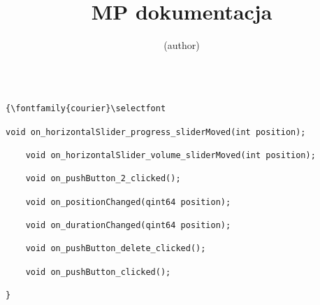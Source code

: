 \documentclass{article}
\begin{document}
\title{MP dokumentacja}
\author{(author)}
\maketitle

\begin{abstract}
\lipsum[1]
\end{abstract}


\begin{tcolorbox}
\begin{lstlisting}

{\fontfamily{courier}\selectfont

void on_horizontalSlider_progress_sliderMoved(int position);

    void on_horizontalSlider_volume_sliderMoved(int position);

    void on_pushButton_2_clicked();

    void on_positionChanged(qint64 position);

    void on_durationChanged(qint64 position);

    void on_pushButton_delete_clicked();

    void on_pushButton_clicked();
    
}

\end{lstlisting}
\end{tcolorbox}
\end{document}
